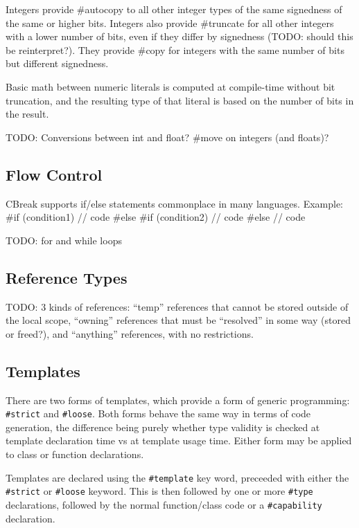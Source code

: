 \documentclass{article}
\newcommand{\code}[1]{\colorbox{light-gray}{\texttt{#1}}}
\newenvironment{codebox} {\snugshade\verbatim} {\endverbatim\endsnugshade}
\begin{document}
Integers provide \#autocopy to all other integer types of the same signedness of the same or higher bits.  Integers also provide \#truncate for all other integers with a lower number of bits, even if they differ by signedness (TODO: should this be reinterpret?).  They provide \#copy for integers with the same number of bits but different signedness.

Basic math between numeric literals is computed at compile-time without bit truncation, and the resulting type of that literal is based on the number of bits in the result.

TODO: Conversions between int and float?  \#move on integers (and floats)?

\subsection{Flow Control}

CBreak supports if/else statements commonplace in many languages.  Example:
\begin{codebox}
#if (condition1)
{
    // code
}
#else #if (condition2)
{
    // code
}
#else
{
    // code
}
\end{codebox}

TODO: for and while loops

\subsection{Reference Types}

TODO: 3 kinds of references: ``temp'' references that cannot be stored outside of the local scope, ``owning'' references that must be ``resolved'' in some way (stored or freed?), and ``anything'' references, with no restrictions.

\subsection{Templates}

There are two forms of templates, which provide a form of generic programming: \code{\#strict} and \code{\#loose}.  Both forms behave the same way in terms of code generation, the difference being purely whether type validity is checked at template declaration time vs at template usage time.  Either form may be applied to class or function declarations.

Templates are declared using the \code{\#template} key word, preceeded with either the \code{\#strict} or \code{\#loose} keyword.  This is then followed by one or more \code{\#type} declarations, followed by the normal function/class code or a \code{\#capability} declaration.
\end{document}
